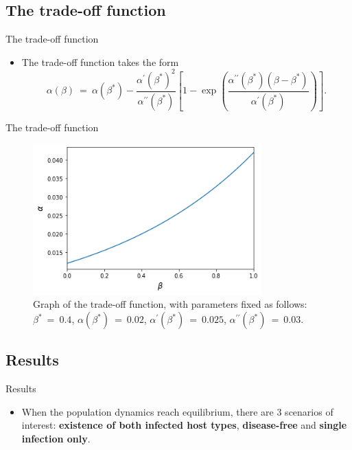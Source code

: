\documentclass{beamer}
\begin{document}
	\subsection{The trade-off function}
	\begin{frame}{The trade-off function}
		\begin{itemize}
			\item The trade-off function takes the form
		\vspace{2em}
		\begin{equation}
			\alpha(\beta)\ =\ \alpha(\beta^{\ast})-\frac{\alpha^{\prime}(\beta^{\ast})^2}{\alpha^{\prime\prime}(\beta^{\ast})}\left[1-\exp\left(\frac{\alpha^{\prime\prime}(\beta^{\ast})(\beta-\beta^{\ast})}{\alpha^{\prime}(\beta^{\ast})}\right)\right].
		\end{equation}
		\end{itemize}
	\end{frame}

	\begin{frame}{The trade-off function}
		\begin{figure}[ht]
			\label{Figure 3}
			\begin{center}
				\includegraphics[width=250pt]{graph_of_trade_off_function.jpg}
			\end{center}
			\caption{Graph of the trade-off function, with parameters fixed as follows: $\beta^{\ast}\ =\ 0.4$, $\alpha(\beta^{\ast})\ =\ 0.02$, $\alpha^{\prime}(\beta^{\ast})\ =\ 0.025$, $\alpha^{\prime\prime}(\beta^{\ast})\ =\ 0.03$.}
		\end{figure}
	\end{frame}

	\subsection{Results}
	\begin{frame}{Results}
		\begin{itemize}
			\item When the population dynamics reach equilibrium, there are 3 scenarios of interest: \textbf{existence of both infected host types}, \textbf{disease-free} and \textbf{single infection only}.
		\end{itemize}
	\end{frame}
	
\end{document}
